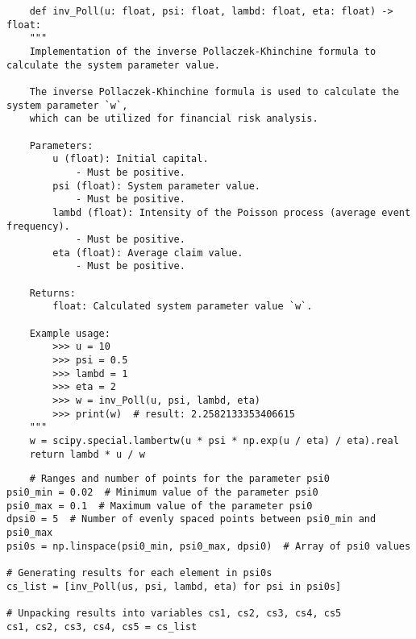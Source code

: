 \documentclass[12pt,letterpaper]{article}
\theoremstyle{definition}
\begin{document}
\begin{lstlisting}
    def inv_Poll(u: float, psi: float, lambd: float, eta: float) -> float:
    """
    Implementation of the inverse Pollaczek-Khinchine formula to calculate the system parameter value.

    The inverse Pollaczek-Khinchine formula is used to calculate the system parameter `w`,
    which can be utilized for financial risk analysis.

    Parameters:
        u (float): Initial capital.
            - Must be positive.
        psi (float): System parameter value.
            - Must be positive.
        lambd (float): Intensity of the Poisson process (average event frequency).
            - Must be positive.
        eta (float): Average claim value.
            - Must be positive.

    Returns:
        float: Calculated system parameter value `w`.

    Example usage:
        >>> u = 10
        >>> psi = 0.5
        >>> lambd = 1
        >>> eta = 2
        >>> w = inv_Poll(u, psi, lambd, eta)
        >>> print(w)  # result: 2.2582133353406615
    """
    w = scipy.special.lambertw(u * psi * np.exp(u / eta) / eta).real
    return lambd * u / w

\end{lstlisting}

\begin{lstlisting}
    # Ranges and number of points for the parameter psi0
psi0_min = 0.02  # Minimum value of the parameter psi0
psi0_max = 0.1  # Maximum value of the parameter psi0
dpsi0 = 5  # Number of evenly spaced points between psi0_min and psi0_max
psi0s = np.linspace(psi0_min, psi0_max, dpsi0)  # Array of psi0 values

# Generating results for each element in psi0s
cs_list = [inv_Poll(us, psi, lambd, eta) for psi in psi0s]

# Unpacking results into variables cs1, cs2, cs3, cs4, cs5
cs1, cs2, cs3, cs4, cs5 = cs_list

\end{lstlisting}
\end{document}
